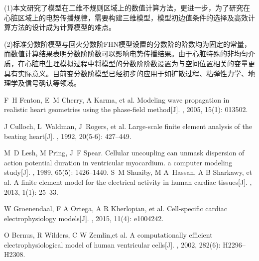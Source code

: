 \documentclass[twoside,UTF8]{nputhesis}
\begin{document}
(1)本文研究了模型在二维不规则区域上的数值计算方法，更进一步，为了研究在心脏区域上的电势传播规律，需要构建三维模型，模型初边值条件的选择及高效计算方法的设计成为计算模型的难点。

(2)标准分数阶模型与回火分数阶FHN模型设置的分数阶的阶数均为固定的常量，而数值计算结果表明分数阶阶数可以影响电势传播结果。由于心脏特殊的非均匀介质，在心脏电生理模拟过程中将模型的分数阶阶数设置为与空间位置相关的变量更具有实际意义。目前变分数阶模型已经初步的应用于如扩散过程、粘弹性力学、地理学及信号确认等领域。


\clearpage



\begin{thebibliography}{99}
	
	\addtolength{\itemsep}{-1.1em} %
	F~H Fenton, E~M Cherry, A Karma, et al.
	\newblock Modeling wave propagation in realistic heart geometries using the
	phase-field method[J].
	, 2005, 15(1): 013502.
	
	J Culloch, L~Waldman, J~Rogers, et al.
	\newblock Large-scale finite element analysis of the beating heart[J].
	, 1992, 20(5-6): 427--449.
	
	M~D Lesh, M Pring, J~F Spear.
	\newblock Cellular uncoupling can unmask dispersion of action potential
	duration in ventricular myocardium. a computer modeling study[J].
	, 1989, 65(5): 1426--1440.
	S~M Shuaiby, M A~Hassan, A B Sharkawy, et al.
	\newblock A finite element model for the electrical activity in human cardiac
	tissues[J].
	, 2013, 1(1): 25--33.
	
	W Groenendaal, F A Ortega, A R Kherlopian, et al.
	\newblock Cell-specific cardiac electrophysiology models[J].
	, 2015, 11(4): e1004242.
	
	O Bernus, R Wilders, C W Zemlin,et al.
	\newblock A computationally efficient electrophysiological model of human
	ventricular cells[J].
	, 2002, 282(6): H2296--H2308.
	

\end{thebibliography}
\end{document}
